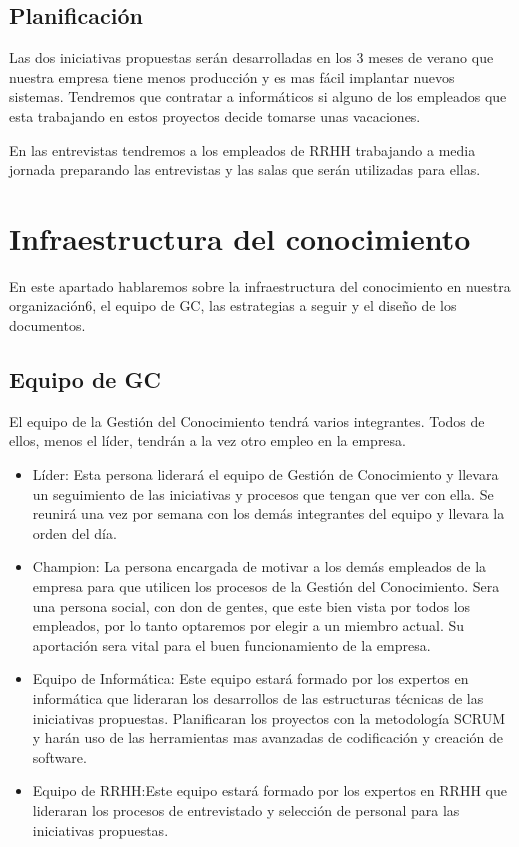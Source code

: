 \documentclass[twoside]{article}
\begin{document}
\subsection{Planificación}

Las dos iniciativas propuestas serán desarrolladas en los 3 meses de verano que nuestra empresa tiene menos producción y es mas fácil implantar nuevos sistemas. Tendremos que contratar a informáticos si alguno de los empleados que esta trabajando en estos proyectos decide tomarse unas vacaciones.\par
En las entrevistas tendremos a los empleados de RRHH trabajando a media jornada preparando las entrevistas y las salas que serán utilizadas para ellas.


\section{Infraestructura del conocimiento}
En este apartado hablaremos sobre la infraestructura del conocimiento en nuestra organización6, el equipo de GC, las estrategias a seguir y el diseño de los documentos.

\subsection{Equipo de GC}

El equipo de la Gestión del Conocimiento tendrá varios integrantes. Todos de ellos, menos el líder, tendrán a la vez otro empleo en la empresa.
\begin{itemize}
	\item Líder: Esta persona liderará el equipo de Gestión de Conocimiento y llevara un seguimiento de las iniciativas y procesos que tengan que ver con ella. Se reunirá una vez por semana con los demás integrantes del equipo y llevara la orden del día.
	
	\item Champion: La persona encargada de motivar a los demás empleados de la empresa para que utilicen los procesos de la Gestión del Conocimiento. Sera una persona social, con don de gentes, que este bien vista por todos los empleados, por lo tanto optaremos por elegir a un miembro actual. Su aportación sera vital para el buen funcionamiento de la empresa.
	
	\item Equipo de Informática: Este equipo estará formado por los expertos en informática que lideraran los desarrollos de las estructuras técnicas de las iniciativas propuestas. Planificaran los proyectos con la metodología SCRUM y harán uso de las herramientas mas avanzadas de codificación y creación de software.
	
	\item Equipo de RRHH:Este equipo estará formado por los expertos en RRHH que lideraran los procesos de entrevistado y selección de personal para las iniciativas propuestas.
\end{itemize}
\end{document}
